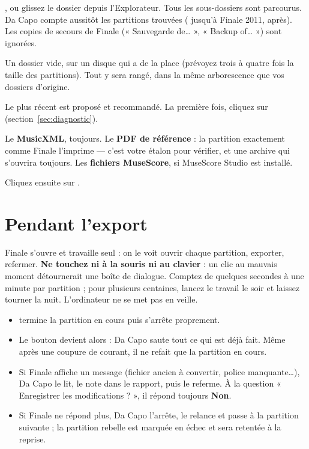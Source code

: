 \begin{description}[style=nextline,leftmargin=5mm,font=\sffamily\bfseries\color{bordeaux}]
\item[1. Où sont vos partitions Finale ?]
, ou glissez le dossier depuis l'Explorateur. Tous les sous-dossiers sont
parcourus. Da Capo compte aussitôt les partitions trouvées ( jusqu'à Finale 2011,
 après). Les copies de secours de Finale (« Sauvegarde de… », « Backup of… ») sont
ignorées.
\item[2. Où ranger le résultat ?]
Un dossier vide, sur un disque qui a de la place (prévoyez trois à quatre fois la taille des
partitions). Tout y sera rangé, dans la même arborescence que vos dossiers d'origine.
\item[3. Avec quel Finale ?]
Le plus récent est proposé et recommandé. La première fois, cliquez sur 
(section~\ref{sec:diagnostic}).
\item[4. Que produire ?]
Le \textbf{MusicXML}, toujours. Le \textbf{PDF de référence} : la partition exactement comme Finale
l'imprime — c'est votre étalon pour vérifier, et une archive qui s'ouvrira toujours. Les
\textbf{fichiers MuseScore}, si MuseScore Studio est installé.
\end{description}

Cliquez ensuite sur .

\section{Pendant l'export}


Finale s'ouvre et travaille seul : on le voit ouvrir chaque partition, exporter, refermer.
\textbf{Ne touchez ni à la souris ni au clavier} : un clic au mauvais moment détournerait une boîte
de dialogue. Comptez de quelques secondes à une minute par partition ; pour plusieurs centaines,
lancez le travail le soir et laissez tourner la nuit. L'ordinateur ne se met pas en veille.

\begin{itemize}
\item {} termine la partition en cours puis s'arrête proprement.
\item Le bouton devient alors  : Da Capo saute tout ce qui est déjà fait.
      Même après une coupure de courant, il ne refait que la partition en cours.
\item Si Finale affiche un message (fichier ancien à convertir, police manquante…), Da Capo le lit,
      le note dans le rapport, puis le referme. À la question « Enregistrer les modifications ? »,
      il répond toujours \textbf{Non}.
\item Si Finale ne répond plus, Da Capo l'arrête, le relance et passe à la partition suivante ;
      la partition rebelle est marquée en échec et sera retentée à la reprise.
\end{itemize}

